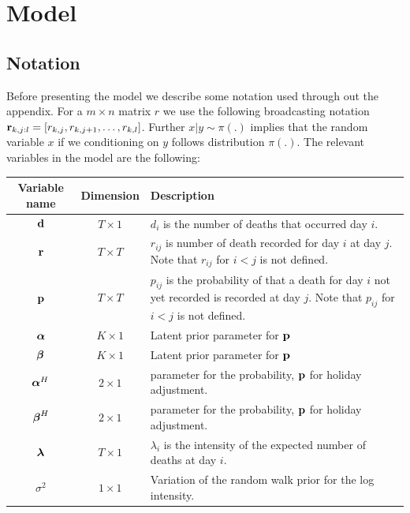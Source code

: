 
% 




\section{Model}

\subsection{Notation}
Before presenting the model we describe some notation used through out the appendix. For a $m \times n$ matrix $r$ we use the following broadcasting notation ${\boldsymbol{\mathrm{r}}}_{k,j:l}=[ r_{k,j}, r_{k,j+1}, \ldots, r_{k,l}]$.
Further $x | y \sim \pi(.)$ implies that the random variable $x$ if we conditioning on $y$ follows distribution $\pi(.)$.
The relevant variables in the model are the following:

	\begin{tabularx}{\linewidth}{ccL}
		Variable name & Dimension & Description \\  \hline
		${\boldsymbol{\mathrm{d}}}$ & $T \times 1$ & $d_i$ is the number of deaths that occurred day $i$. \\
		${\boldsymbol{\mathrm{r}}}$ & $T \times T$ & $r_{ij}$ is number of death recorded for day $i$ at day $j$.  Note that $r_{ij}$ for $i<j$ is not defined.   \\
		${\boldsymbol{\mathrm{p}}}$ & $T \times T$ & $p_{ij}$ is the probability of that a death for day $i$ not yet recorded is recorded at day $j$.
		  Note that $p_{ij}$ for $i<j$ is not defined.  \\
		${\boldsymbol{\mathrm{\alpha}}}$ & $K \times 1$ & Latent prior parameter for ${\boldsymbol{\mathrm{p}}}$ \\
		${\boldsymbol{\mathrm{\beta}}}$ & $K \times 1$ & Latent prior parameter for ${\boldsymbol{\mathrm{p}}}$ \\
		${\boldsymbol{\mathrm{\alpha}}}^H$ & $2 \times 1$ & parameter for the probability, ${\boldsymbol{\mathrm{p}}}$ for holiday adjustment. \\
		${\boldsymbol{\mathrm{\beta}}}^H$ & $2 \times 1$ & parameter for the probability, ${\boldsymbol{\mathrm{p}}}$ for holiday adjustment. \\
		${\boldsymbol{\mathrm{\lambda}}}$ &  $T \times 1$ &  $\lambda_i$  is the intensity of the expected number of deaths at day $i$. \\
		$\sigma^2$ & $1\times 1$ & Variation of the random walk prior for the log intensity.

	\end{tabularx}
